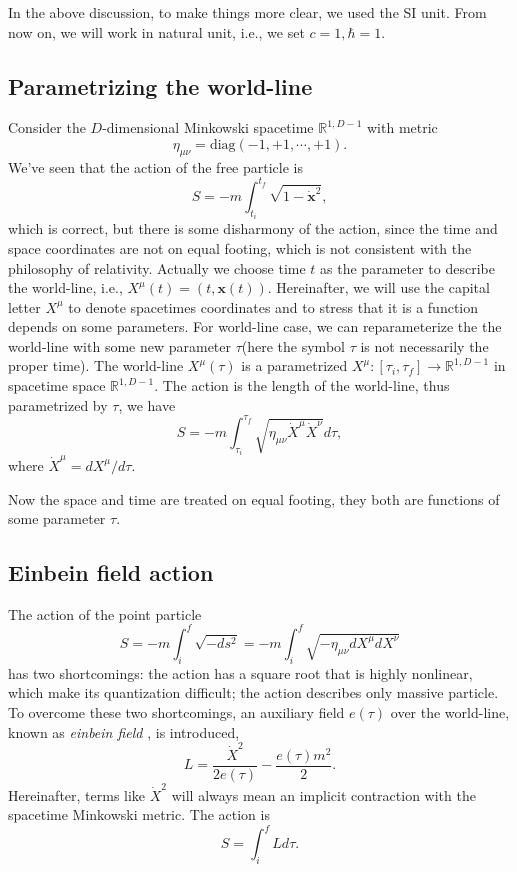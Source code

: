 \documentclass[graybox,envcountchap,sectrefs]{svmono}
\begin{document}
In the above discussion, to make things more clear, we used the SI unit. From now on, we will work in natural unit, i.e., we set $c=1,\hbar=1$.

\subsection{Parametrizing the world-line}
Consider the $D$-dimensional Minkowski spacetime $\mathbb{R}^{1,D-1}$ with metric
$$\eta_{\mu\nu}=\mathrm{diag}(-1,+1,\cdots,+1).$$
We've seen that the action of the free particle is 
$$S=-m\int_{t_i}^{t_f}\sqrt{1-\dot{\mathbf{x}}^2},$$
which is correct, but there is some disharmony of the action, since the time and space coordinates are not on equal footing, which is not consistent with the philosophy of relativity. Actually we choose time $t$ as the parameter to describe the world-line, i.e., $X^{\mu}(t)=(t,\mathbf{x}(t))$. Hereinafter, we will use the capital letter $X^{\mu}$ to denote spacetimes coordinates and to stress that it is a function depends on some parameters. For world-line case, we can reparameterize the the world-line with some new parameter $\tau$(here the symbol $\tau$ is not necessarily the proper time). The world-line $X^{\mu}(\tau)$ is a parametrized  $X^{\mu}:[\tau_i,\tau_f]\to \mathbb{R}^{1,D-1}$  in spacetime space $\mathbb{R}^{1,D-1}$. The action is the length of the world-line, thus parametrized by $\tau$, we have
\begin{equation}
S=-m\int_{\tau_i}^{\tau_f}\sqrt{\eta_{\mu\nu}\dot{X}^{\mu}\dot{X}^{\nu}}d\tau,
\end{equation}
where $\dot{X}^{\mu}=dX^{\mu}/d\tau$.

Now the space and time are treated on equal footing, they both are functions of some parameter $\tau$.

\subsection{Einbein field action}
The action of the point particle
$$S=-m\int_{i}^f \sqrt{-d s^2}=-m\int_{i}^f \sqrt{-\eta_{\mu\nu}dX^{\mu}dX^{\nu}}$$
has two shortcomings: the action has a square root that is highly nonlinear, which make its quantization difficult; 
the action describes only massive particle. 
To overcome these two shortcomings, an auxiliary field $e(\tau)$ over the world-line, known as \emph{einbein field} , is introduced,
\begin{equation}\label{eq:einbeinlag}
\boxed{L=\frac{\dot{X}^2}{2e(\tau)}-\frac{e(\tau)m^2}{2}.}
\end{equation}
Hereinafter, terms like $\dot{X}^2$ will always mean an implicit contraction with the spacetime Minkowski metric. The action is 
$$S=\int_{i}^fLd\tau.$$
\end{document}
